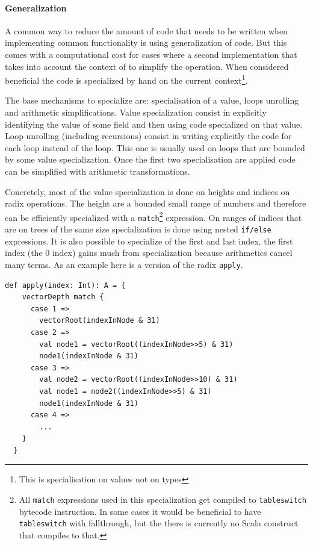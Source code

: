 \paragraph{Generalization}
A common way to reduce the amount of code that needs to be written when implementing common functionality is using generalization of code. But this comes with a computational cost for cases where a second implementation that takes into account the context of to simplify the operation. When considered beneficial the code is specialized by hand on the current context\footnote{This is specialisation on values not on types}. 

The base mechanisms to specialize are: specialisation of a value, loops unrolling and arithmetic simplifications. Value specialization consist in explicitly identifying the value of some field and then using code specialized on that value. Loop unrolling (including recursions) consist in writing explicitly the code for each loop instead of the loop. This one is usually used on loops that are bounded by some value specialization. Once the first two specialisation are applied code can be simplified with arithmetic transformations. 

Concretely, most of the value specialization is done on heights and indices on radix operations. The height are a bounded small range of numbers and therefore can be efficiently specialized with a \texttt{match}\footnote{All \texttt{match} expressions used in this specialization get compiled to \texttt{tableswitch} bytecode instruction. In some cases it would be beneficial to have  \texttt{tableswitch} with fallthrough, but the there is currently no Scala construct that compiles to that.} expression. On ranges of indices that are on trees of the same size specialization is done using nested \texttt{if/else} expressions. It is also possible to specialize of the first and last index, the first index (the 0 index) gains much from specialization because arithmetics cancel many terms. As an example here is a version of the radix \texttt{apply}.

\begin{lstlisting}[frame=single]
def apply(index: Int): A = {
    vectorDepth match {
      case 1 => 
        vectorRoot(indexInNode & 31)
      case 2 => 
        val node1 = vectorRoot((indexInNode>>5) & 31)
        node1(indexInNode & 31)
      case 3 => 
        val node2 = vectorRoot((indexInNode>>10) & 31)
        val node1 = node2((indexInNode>>5) & 31)
        node1(indexInNode & 31)
      case 4 =>
        ...
    }
  }
\end{lstlisting}

